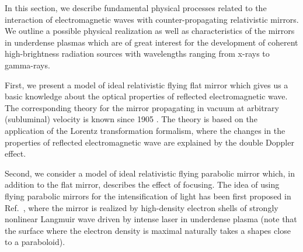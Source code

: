 \documentclass[10pt, a4paper, twoside, openright]{report}
\begin{document}
%

%

%

%

In this section, we describe fundamental physical processes related to the interaction of electromagnetic waves with counter-propagating relativistic mirrors. We outline a possible physical realization as well as characteristics of the mirrors in underdense plasmas which are of great interest for the development of coherent high-brightness radiation sources with wavelengths ranging from x-rays to gamma-rays.

First, we present a model of ideal relativistic flying flat mirror which gives us a basic knowledge about the optical properties of reflected electromagnetic wave. The corresponding theory for the mirror propagating in vacuum at arbitrary (subluminal) velocity is known since 1905 \cite{Einstein1905}. The theory is based on the application of the Lorentz transformation formalism, where the changes in the properties of reflected electromagnetic wave are explained by the double Doppler effect.

Second, we consider a model of ideal relativistic flying parabolic mirror which, in addition to the flat mirror, describes the effect of focusing. The idea of using flying parabolic mirrors for the intensification of light has been first proposed in Ref.~\cite{Bulanov2003}, where the mirror is realized by high-density electron shells of strongly nonlinear Langmuir wave driven by intense laser in underdense plasma (note that the surface where the electron density is maximal naturally takes a shapes close to a paraboloid).
\end{document}
